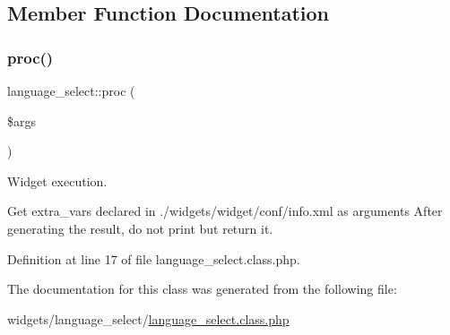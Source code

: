 \subsection{Member Function Documentation}
\hypertarget{classlanguage__select_a6c93581389af6a3ca6d149d384196479}{}\label{classlanguage__select_a6c93581389af6a3ca6d149d384196479} 
\subsubsection{\texorpdfstring{proc()}{proc()}}
{\footnotesize\ttfamily language\+\_\+select\+::proc (\begin{DoxyParamCaption}\item[{}]{\$args }\end{DoxyParamCaption})}



Widget execution. 

Get extra\+\_\+vars declared in ./widgets/widget/conf/info.xml as arguments After generating the result, do not print but return it. 

Definition at line 17 of file language\+\_\+select.\+class.\+php.



The documentation for this class was generated from the following file\+:\begin{DoxyCompactItemize}
\item 
widgets/language\+\_\+select/\hyperlink{language__select_8class_8php}{language\+\_\+select.\+class.\+php}\end{DoxyCompactItemize}
